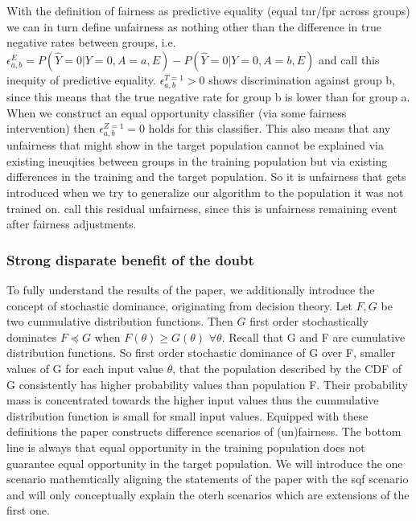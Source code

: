 With the definition of fairness as predictive equality (equal tnr/fpr across groups) we can in turn define unfairness as nothing other than the difference in true negative rates between groups, i.e. \(\epsilon_{a,b}^E = P(\hat{Y} = 0 | Y = 0, A = a, E) - P(\hat{Y} = 0 | Y = 0, A = b, E)\) and call this inequity of predictive equality. $\epsilon_{a,b}^{T=1} > 0$ shows discrimination against group b, since this means that the true negative rate for group b is lower than for group a.
When we construct an equal opportunity classifier (via some fairness intervention) then $\epsilon_{a,b}^{Z=1} = 0$ holds for this classifier. This also means that any unfairness that might show in the target population cannot be explained via existing ineuqities between groups in the training population but via existing differences in the training and the target population. So it is unfairness that gets introduced when we try to generalize our algorithm to the population it was not trained on. \cite{kallus2018} call this residual unfairness, since this is unfairness remaining event after fairness adjustments.

\subsubsection*{Strong disparate benefit of the doubt}
To fully understand the results of the paper, we additionally introduce the concept of stochastic dominance, originating from decision theory. Let $F, G$ be two cummulative distribution functions. Then $G$ first order stochastically dominates $F \preceq G$ when $F(\theta) \geq G(\theta)$ $\forall\theta$. Recall that G and F are cumulative distribution functions. So first order stochastic dominance of G over F, smaller values of G for each input value $\theta$, that the population described by the CDF of G consistently has higher probability values than population F. Their probability mass is concentrated towards the higher input values thus the cummulative distribution function is small for small input values.
Equipped with these definitions the paper constructs difference scenarios of (un)fairness. The bottom line is always that equal opportunity in the training population does not guarantee equal opportunity in the target population. We will introduce the one scenario mathemtically aligning the statements of the paper with the sqf scenario and will only conceptually explain the oterh scenarios which are extensions of the first one.

